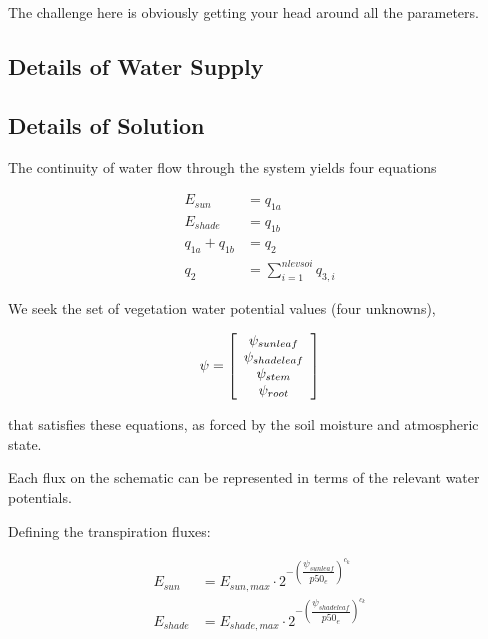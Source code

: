 \documentclass[draft,linenumbers]{agujournal}
\begin{document}
The challenge here is obviously getting your head around all the parameters.

\subsection{Details of Water Supply}

\subsection{Details of Solution}


The continuity of water flow through the system yields four equations
   \begin{linenomath*} \begin{equation}
   \begin{aligned}
   E_{sun}&=q_{1a}\\
   E_{shade}&=q_{1b}\\
   q_{1a}+q_{1b}&=q_2\\
   q_2&=\sum_{i=1}^{nlevsoi}{q_{3,i}}
   \end{aligned}
   \end{equation} \end{linenomath*}

We seek the set of vegetation water potential values (four unknowns), 

   \begin{linenomath*} \begin{equation}
   \psi=\left[ \begin {array}{c} 
   \psi_{sunleaf}\cr\psi_{shadeleaf}\cr\psi_{stem}\cr\psi_{root}
   \end {array} \right] 
   \end{equation} \end{linenomath*}

that satisfies these equations, as forced by the soil moisture and atmospheric state. 

Each flux on the schematic can be represented in terms of the relevant water potentials. 

Defining the transpiration fluxes:


   \begin{linenomath*} \begin{equation}
   \begin{aligned}
   E_{sun} &= E_{sun,max} \cdot 2^{-\left(\dfrac{\psi_{sunleaf}}{p50_e}\right)^{c_k}} \\
   E_{shade} &= E_{shade,max} \cdot 2^{-\left(\dfrac{\psi_{shadeleaf}}{p50_e}\right)^{c_k}} 
   \end{aligned}
   \end{equation} \end{linenomath*}
\end{document}
